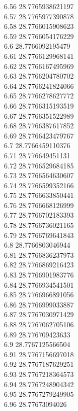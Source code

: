{6.56	28.7765938621197\\
6.57	28.7765977390878\\
6.58	28.7766015908623\\
6.59	28.7766054176229\\
6.6	28.7766092195479\\
6.61	28.7766129968141\\
6.62	28.7766167495969\\
6.63	28.7766204780702\\
6.64	28.7766241824066\\
6.65	28.7766278627772\\
6.66	28.7766315193519\\
6.67	28.7766351522989\\
6.68	28.7766387617852\\
6.69	28.7766423479767\\
6.7	28.7766459110376\\
6.71	28.776649451131\\
6.72	28.7766529684185\\
6.73	28.7766564630607\\
6.74	28.7766599352166\\
6.75	28.7766633850441\\
6.76	28.7766668126999\\
6.77	28.7766702183393\\
6.78	28.7766736021165\\
6.79	28.7766769641843\\
6.8	28.7766803046944\\
6.81	28.7766836237973\\
6.82	28.7766869216423\\
6.83	28.7766901983776\\
6.84	28.7766934541501\\
6.85	28.7766966891056\\
6.86	28.7766999033887\\
6.87	28.7767030971429\\
6.88	28.7767062705106\\
6.89	28.776709423633\\
6.9	28.7767125566504\\
6.91	28.7767156697018\\
6.92	28.7767187629251\\
6.93	28.7767218364573\\
6.94	28.7767248904342\\
6.95	28.7767279249905\\
6.96	28.77673094026\\
}
